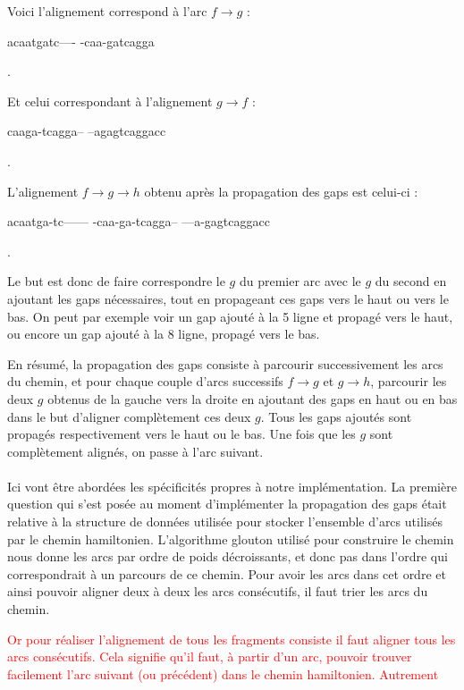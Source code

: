 \documentclass{article}
\begin{document}
Voici l'alignement correspond à l'arc $f \to g$ :  
\begin{boxedverbatim}
acaatgatc----
-caa-gatcagga
\end{boxedverbatim}.

Et celui correspondant à l'alignement $g \to f$ :  
\begin{boxedverbatim}
caaga-tcagga--
--agagtcaggacc
\end{boxedverbatim}.

L'alignement $f \to g \to h$ obtenu après la propagation des gaps est celui-ci : 

\begin{boxedverbatim}
acaatga-tc------
-caa-ga-tcagga--
---a-gagtcaggacc
\end{boxedverbatim}.

Le but est donc de faire correspondre le $g$ du premier arc avec le $g$ du second en ajoutant les gaps nécessaires, tout en propageant ces gaps vers le haut ou vers le bas. On peut par exemple voir un gap ajouté à la 5 ligne et propagé vers le haut, ou encore un gap ajouté à la 8 ligne, propagé vers le bas.

En résumé, la propagation des gaps consiste à parcourir successivement les arcs du chemin, et pour chaque couple d'arcs successifs
$f \to g$ et $g \to h$, parcourir les deux $g$ obtenus de la gauche vers la droite en ajoutant des gaps en haut ou en bas dans le but d'aligner complètement ces deux $g$. Tous les gaps ajoutés sont propagés respectivement vers le haut ou le bas. Une fois que les $g$ sont complètement alignés, on passe à l'arc suivant.
\\~\\


Ici vont être abordées les spécificités propres à notre implémentation. La première question qui s'est posée au moment d'implémenter la propagation des gaps était relative à la structure de données utilisée pour stocker l'ensemble d'arcs utilisés par le chemin hamiltonien. 
L'algorithme glouton utilisé pour construire le chemin nous donne les arcs par ordre de poids décroissants, et donc pas dans l'ordre qui correspondrait à un parcours de ce chemin. Pour avoir les arcs dans cet ordre et ainsi pouvoir aligner deux à deux les arcs consécutifs, il faut trier les arcs du chemin.

\textcolor{red}{
Or pour réaliser l'alignement de tous les fragments consiste  il faut aligner tous les arcs consécutifs. Cela signifie qu'il faut, à partir d'un arc, pouvoir trouver facilement l'arc suivant (ou précédent) dans le chemin hamiltonien. Autrement}
\end{document}
